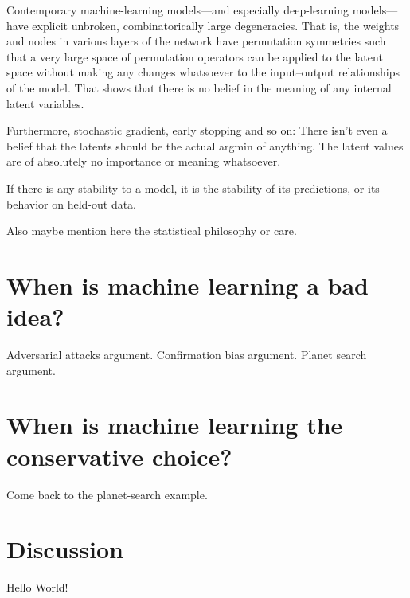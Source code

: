 \documentclass[11pt]{article}
\begin{document}
Contemporary machine-learning models---and especially deep-learning models---have explicit unbroken, combinatorically large degeneracies.
That is, the weights and nodes in various layers of the network have permutation symmetries such that a very large space of permutation operators can be applied to the latent space without making any changes whatsoever to the input--output relationships of the model.
That shows that there is no belief in the meaning of any internal latent variables.

Furthermore, stochastic gradient, early stopping and so on:
There isn't even a belief that the latents should be the actual argmin of anything.
The latent values are of absolutely no importance or meaning whatsoever.

If there is any stability to a model, it is the stability of its predictions, or its behavior on held-out data.

Also maybe mention here the statistical philosophy or care.

\section{When is machine learning a bad idea?}

Adversarial attacks argument. Confirmation bias argument. Planet search argument.

\section{When is machine learning the conservative choice?}

Come back to the planet-search example.

\section{Discussion}\label{sec:discussion}

Hello World!



\end{document}
